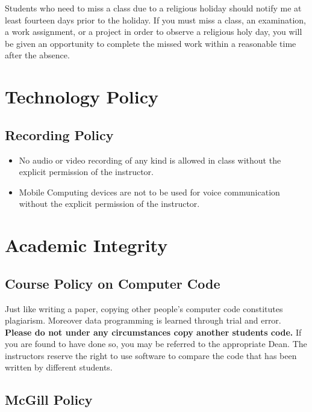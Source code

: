 \documentclass[11pt,]{article}
\providecommand{\tightlist}{%
  \setlength{\itemsep}{0pt}\setlength{\parskip}{0pt}}
\begin{document}
Students who need to miss a class due to a religious holiday should
notify me at least fourteen days prior to the holiday. If you must miss
a class, an examination, a work assignment, or a project in order to
observe a religious holy day, you will be given an opportunity to
complete the missed work within a reasonable time after the absence.

\section{Technology Policy}\label{technology-policy}

\subsection{Recording Policy}\label{recording-policy}

\begin{itemize}
\tightlist
\item
  No audio or video recording of any kind is allowed in class without
  the explicit permission of the instructor.
\item
  Mobile Computing devices are not to be used for voice communication
  without the explicit permission of the instructor.
\end{itemize}

\section{Academic Integrity}\label{academic-integrity}

\subsection{Course Policy on Computer
Code}\label{course-policy-on-computer-code}

Just like writing a paper, copying other people's computer code
constitutes plagiarism. Moreover data programming is learned through
trial and error. \textbf{Please do not under any circumstances copy
another students code.} If you are found to have done so, you may be
referred to the appropriate Dean. The instructors reserve the right to
use software to compare the code that has been written by different
students.

\subsection{McGill Policy}\label{mcgill-policy}
\end{document}
